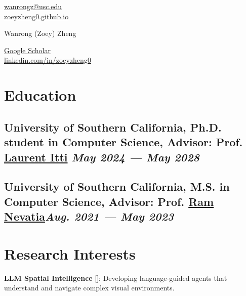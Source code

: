\documentclass[a4,10pt]{article}
\begin{document}
\nocite{*}

\begin{center}
    \begin{minipage}[b]{0.24\textwidth}
            {\href{mailto:wanrongz@usc.edu}{wanrongz@usc.edu} } \\
            \href{https://zoeyzheng0.github.io/}{zoeyzheng0.github.io}
    \end{minipage}%
    \begin{minipage}[b]{0.52\textwidth}
            \centering
            {\LARGE Wanrong (Zoey) Zheng} \\
    \end{minipage}%
    \begin{minipage}[b]{0.24\textwidth}
            \flushright \large
            \normalsize \href{https://scholar.google.com/citations?user=2BkMihkAAAAJ&hl=en}{Google Scholar} \\
            \normalsize \href{https://www.linkedin.com/in/zoeyzheng0/}{linkedin.com/in/zoeyzheng0}
    \end{minipage}

\end{center}

\section{Education}
\subsection*{University of Southern California{\normalsize \normalfont, Ph.D. student in Computer Science, Advisor: Prof. \href{http://ilab.usc.edu/itti/}{Laurent Itti}  \hfill \textit{May 2024 --- May 2028}}}
\vspace{0.15cm}
\subsection*{University of Southern California{\normalsize \normalfont, M.S. in Computer Science, Advisor: Prof. \href{https://sites.usc.edu/iris-cvlab/professor-ram-nevatia/} {Ram Nevatia}\hfill \textit{Aug. 2021 --- May 2023}}}
\vspace{0.5cm}

\section{Research Interests}
\textbf{LLM Spatial Intelligence} []: Developing language-guided agents that understand and navigate complex visual environments.
\end{document}

